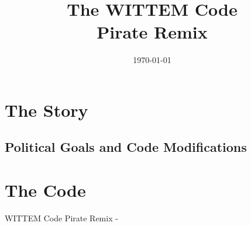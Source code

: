 



\title{The WITTEM Code\\\large Pirate Remix\\\vspace{4ex}\texttt{\WCPRVersion}}
\author{}
\date{\sffamily\today}





\cleardoublepage

\tableofcontents


\chapter{The Story}





\section{Political Goals and Code Modifications}





\chapter{The Code}
WITTEM Code Pirate Remix - \WCPRVersion












